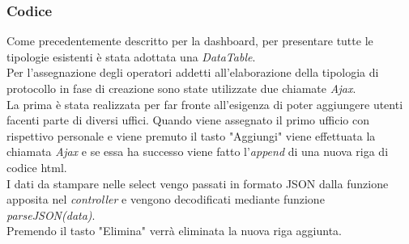     \subsubsection{Codice}
        Come precedentemente descritto per la dashboard, per presentare tutte le tipologie esistenti è stata adottata una \textit{DataTable}.
        \\
        Per l'assegnazione degli operatori addetti all'elaborazione della tipologia di protocollo in fase di creazione sono state utilizzate due chiamate \textit{Ajax}.
        \\
        La prima è stata realizzata per far fronte all'esigenza di poter aggiungere utenti facenti parte di diversi uffici. Quando viene assegnato il primo ufficio con rispettivo personale e viene premuto il tasto "Aggiungi" viene effettuata la chiamata \textit{Ajax} e se essa ha successo viene fatto l'\textit{append} di una nuova riga di codice html.
        \\
        I dati da stampare nelle select vengo passati in formato JSON dalla funzione apposita nel \textit{controller} e vengono decodificati mediante funzione \textit{parseJSON(data)}.
        \\ 
        Premendo il tasto "Elimina" verrà eliminata la nuova riga aggiunta.
